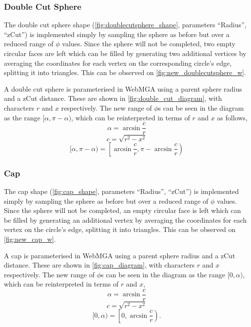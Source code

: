 
\subsubsection{Double Cut Sphere}
The double cut sphere shape (\cref{fig:doublecutsphere_shape}, parameters ``Radius'', ``zCut'') is implemented simply by sampling the sphere as before but over a reduced range of $\phi$ values. Since the sphere will not be completed, two empty circular faces are left which can be filled by generating two additional vertices by averaging the coordinates for each vertex on the corresponding circle's edge, splitting it into triangles. This can be observed on \cref{fig:new_doublecutsphere_w}.

A double cut sphere is parameterised in WebMGA using a parent sphere radius and a zCut distance. These are shown in \cref{fig:double_cut_diagram}, with characters $r$ and $x$ respectively. The new range of $\phi$s can be seen in the diagram as the range $[\alpha,\pi-\alpha)$, which can be reinterpreted in terms of $r$ and $x$ as follows,
\begin{equation}
\alpha=\arcsin\frac{c}{r}
\end{equation}
\begin{equation}
c=\sqrt{r^2-x^2}
\end{equation}
\begin{equation}
[\alpha,\pi-\alpha)=\left[\arcsin\frac{c}{r},\pi - \arcsin\frac{c}{r}\right)
\end{equation}

\subsubsection{Cap}
\label{cap_section}
The cap shape (\cref{fig:cap_shape}, parameters ``Radius'', ``zCut'') is implemented simply by sampling the sphere as before but over a reduced range of $\phi$ values. Since the sphere will not be completed, an empty circular face is left which can be filled by generating an additional vertex by averaging the coordinates for each vertex on the circle's edge, splitting it into triangles. This can be observed on \cref{fig:new_cap_w}.

A cap is parameterised in WebMGA using a parent sphere radius and a zCut distance. These are shown in \cref{fig:cap_diagram}, with characters $r$ and $x$ respectively. The new range of $\phi$s can be seen in the diagram as the range $[0,\alpha)$, which can be reinterpreted in terms of $r$ and $x$,
\begin{equation}
\alpha=\arcsin\frac{c}{r}
\end{equation}
\begin{equation}
c=\sqrt{r^2-x^2}
\end{equation}
\begin{equation}
[0, \alpha)=\left[ 0, \arcsin\frac{c}{r} \right).
\end{equation}

